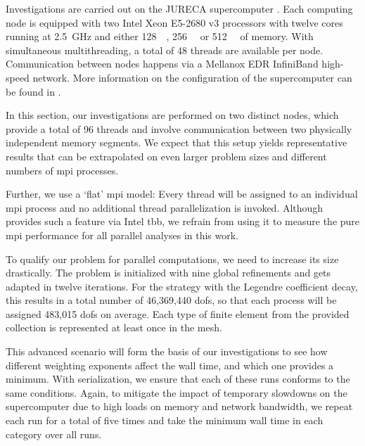 
Investigations are carried out on the JURECA supercomputer \parencite{krause2018,jureca}. Each computing node is equipped with two Intel\textsuperscript{\textregistered} Xeon\textsuperscript{\textregistered} E5-2680 v3 processors with twelve cores running at \SI{2.5}{\giga\hertz} and either \SI{128}{\giga\byte}, \SI{256}{\giga\byte} or \SI{512}{\giga\byte} of memory. With simultaneous multithreading, a total of 48 threads are available per node. Communication between nodes happens via a Mellanox\textsuperscript{\textregistered} EDR InfiniBand high-speed network. More information on the configuration of the supercomputer can be found in \textcite{jureca}.

In this section, our investigations are performed on two distinct nodes, which provide a total of 96 threads and involve communication between two physically independent memory segments. We expect that this setup yields representative results that can be extrapolated on even larger problem sizes and different numbers of \gls{mpi} processes.

Further, we use a `flat' \gls{mpi} model: Every thread will be assigned to an individual \gls{mpi} process and no additional thread parallelization is invoked. Although \dealii{} provides such a feature via Intel\textsuperscript{\textregistered} \gls{tbb}, we refrain from using it to measure the pure \gls{mpi} performance for all parallel analyses in this work.


To qualify our problem for parallel computations, we need to increase its size drastically. The problem is initialized with nine global refinements and gets adapted in twelve iterations. For the strategy with the Legendre coefficient decay, this results in a total number of 46,369,440 \glspl{dof}, so that each process will be assigned 483,015 \glspl{dof} on average. Each type of finite element from the provided collection is represented at least once in the mesh.

This advanced scenario will form the basis of our investigations to see how different weighting exponents affect the wall time, and which one provides a minimum. With serialization, we ensure that each of these runs conforms to the same conditions. Again, to mitigate the impact of temporary slowdowns on the supercomputer due to high loads on memory and network bandwidth, we repeat each run for a total of five times and take the minimum wall time in each category over all runs.


